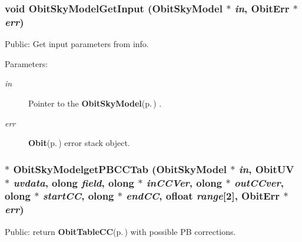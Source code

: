 \subsubsection{\setlength{\rightskip}{0pt plus 5cm}void Obit\-Sky\-Model\-Get\-Input ({\bf Obit\-Sky\-Model} $\ast$ {\em in}, {\bf Obit\-Err} $\ast$ {\em err})}\label{ObitSkyModel_8h_a69}


Public: Get input parameters from info. 

\begin{Desc}
\item[Parameters:]
\begin{description}
\item[{\em in}]Pointer to the {\bf Obit\-Sky\-Model}{\rm (p.\,\pageref{structObitSkyModel})} . \item[{\em err}]{\bf Obit}{\rm (p.\,\pageref{structObit})} error stack object. \end{description}
\end{Desc}
\subsubsection{$\ast$ Obit\-Sky\-Modelget\-PBCCTab ({\bf Obit\-Sky\-Model} $\ast$ {\em in}, {\bf Obit\-UV} $\ast$ {\em uvdata}, {\bf olong} {\em field}, {\bf olong} $\ast$ {\em in\-CCVer}, {\bf olong} $\ast$ {\em out\-CCver}, {\bf olong} $\ast$ {\em start\-CC}, {\bf olong} $\ast$ {\em end\-CC}, {\bf ofloat} {\em range}[2], {\bf Obit\-Err} $\ast$ {\em err})}\label{ObitSkyModel_8h_a73}


Public: return {\bf Obit\-Table\-CC}{\rm (p.\,\pageref{structObitTableCC})} with possible PB corrections. 

